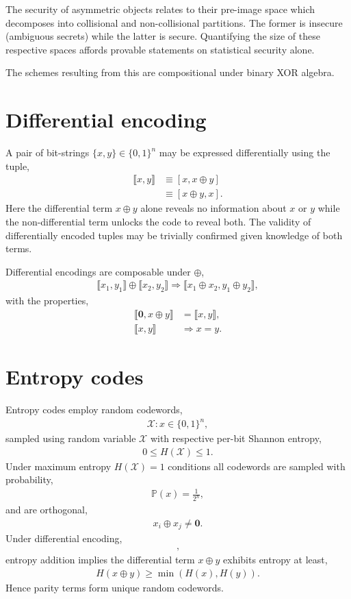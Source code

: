 \documentclass[twocolumn, aps, amsmath, amssymb, nofootinbib, superscriptaddress, longbibliography, doublefloatfix, table-of-contents, eqsecnum, rmp]{revtex4-2}
\def\zerovec{\mathbf{0}}
\def\diff#1#2{\llbracket #1,#2\rrbracket}
\begin{document}
The security of asymmetric objects relates to their pre-image space which decomposes into collisional and non-collisional partitions. The former is insecure (ambiguous secrets) while the latter is secure. Quantifying the size of these respective spaces affords provable statements on statistical security alone.

The schemes resulting from this are compositional under binary XOR algebra.

\section{Differential encoding}

A pair of bit-strings $\{x,y\}\in\{0,1\}^n$ may be expressed differentially using the tuple,
\begin{align}
	\diff{x}{y} &\equiv [x,x\oplus y] \nonumber\\
	&\equiv [x\oplus y,x].
\end{align}
Here the differential term $x\oplus y$ alone reveals no information about $x$ or $y$ while the non-differential term unlocks the code to reveal both. The validity of differentially encoded tuples may be trivially confirmed given knowledge of both terms.

Differential encodings are composable under $\oplus$,
\begin{align}
	\diff{x_1}{y_1} \oplus \diff{x_2}{y_2} \Rightarrow \diff{x_1\oplus x_2}{y_1 \oplus y_2},
\end{align}
with the properties,
\begin{align}
	\diff{\zerovec}{x\oplus y} &= \diff{x}{y}, \nonumber\\
	\diff{x}{y} &\Rightarrow x=y.
\end{align}

\section{Entropy codes}

Entropy codes employ random codewords,
\begin{align}
	\mathcal{X}: x \in \{0,1\}^n,
\end{align}
sampled using random variable $\mathcal{X}$ with respective per-bit Shannon entropy,
\begin{align}
	0\leq H(\mathcal{X})\leq 1.
\end{align}
Under maximum entropy $H(\mathcal{X})=1$ conditions all codewords are sampled with probability,
\begin{align}
	\mathbb{P}(x) = \frac{1}{2^n},	
\end{align}
and are orthogonal,
\begin{align}
	x_i \oplus x_j \neq \mathbf{0}.
\end{align}
Under differential encoding,
\begin{align}
	[x,x\oplus y],
\end{align}
entropy addition implies the differential term $x\oplus y$ exhibits entropy at least,
\begin{align}
	H(x\oplus y) \geq \min(H(x),H(y)).
\end{align}
Hence parity terms form unique random codewords.
\end{document}
